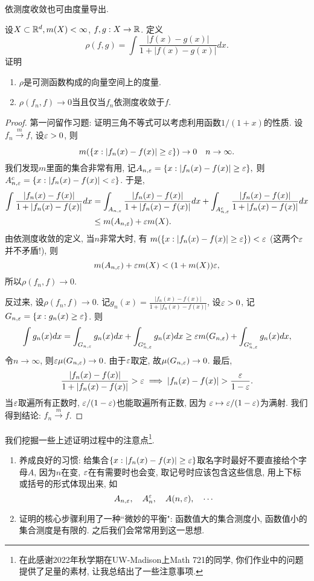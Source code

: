 依测度收敛也可由度量导出.
\begin{example}
    设$X \subset \mathbb{R}^d, m(X)<\infty$, $f, g: X \to \mathbb{R}$. 定义
    $$\rho(f,g) = \int \frac{|f(x)-g(x)|}{1+|f(x)-g(x)|}dx.$$
    证明
    \begin{enumerate}
        \item $\rho$是可测函数构成的向量空间上的度量.
        \item $\rho(f_n, f) \to 0$当且仅当$f_n$依测度收敛于$f$. 
    \end{enumerate}
\end{example}
\begin{proof}
    第一问留作习题: 证明三角不等式可以考虑利用函数$1/(1+x)$的性质.
    设$f_n \xrightarrow[]{m} f$, 设$\varepsilon > 0$, 则
    $$m(\{x:|f_n(x)-f(x)| \geq \varepsilon\}) \to 0 \quad n \to \infty.$$
    我们发现$m$里面的集合非常有用, 记$A_{n, \varepsilon} = \{x:|f_n(x)-f(x)| \geq \varepsilon\},$ 则$A_{n, \varepsilon}^c = \{x:|f_n(x)-f(x)| < \varepsilon\}$. 于是,
    \begin{align*}
    \int \frac{|f_n(x)-f(x)|}{1+|f_n(x)-f(x)|}dx
    &= \int_{A_{n,\varepsilon}}\frac{|f_n(x)-f(x)|}{1+|f_n(x)-f(x)|}dx 
       + \int_{A_{n,\varepsilon}^c}\frac{|f_n(x)-f(x)|}{1+|f_n(x)-f(x)|}dx \\
    &\leq m(A_{n, \varepsilon}) + \varepsilon m(X).
    \end{align*}
    由依测度收敛的定义, 当$n$非常大时, 有
    $m(\{x:|f_n(x)-f(x)| \geq \varepsilon\}) < \varepsilon$ (这两个$\varepsilon$并不矛盾!), 则$$ m(A_{n,\varepsilon}) + \varepsilon m(X) < (1+m(X))\varepsilon, $$ 
    所以$\rho(f_n, f) \to 0$. 

    反过来, 设$\rho(f_n, f) \to 0$. 记$g_n(x) =  \frac{|f_n(x)-f(x)|}{1+|f_n(x)-f(x)|}$, 设$\varepsilon > 0$, 记
    $G_{n,\varepsilon} = \{x: g_n(x) \geq \varepsilon\}$. 则
    $$\int g_n(x)dx = \int_{G_{n,\varepsilon}}g_n(x)dx + 
      \int_{G_{n,\varepsilon}^c} g_n(x)dx \geq \varepsilon m(G_{n,\varepsilon})
      +  \int_{G_{n,\varepsilon}^c} g_n(x)dx, $$
    令$n \to \infty$, 则$\varepsilon \mu(G_{n,\varepsilon}) \to 0$. 由于$\varepsilon$取定, 故$ \mu(G_{n,\varepsilon}) \to 0 $.
    最后, 
    $$\frac{|f_n(x)-f(x)|}{1+|f_n(x)-f(x)|}>\varepsilon \implies 
    |f_n(x)-f(x)| > \frac{\varepsilon}{1-\varepsilon}.$$
    当$\varepsilon$取遍所有正数时, $\varepsilon/(1-\varepsilon)$也能取遍所有正数, 因为
    $\varepsilon \mapsto \varepsilon/(1-\varepsilon)$为满射. 我们得到结论: $f_n \xrightarrow[]{m} f$.
\end{proof}
\begin{remark}
    我们挖掘一些上述证明过程中的注意点\footnote{在此感谢2022年秋学期在UW-Madison上Math 721的同学, 你们作业中的问题提供了足量的素材, 让我总结出了一些注意事项. }. 
    \begin{enumerate}
    \item 养成良好的习惯: 给集合$\{x:|f_n(x)-f(x)| \geq \varepsilon\}$取名字时最好不要直接给个字母$A$, 因为$n$在变, $\varepsilon$在有需要时也会变, 取记号时应该包含这些信息, 用上下标或括号的形式体现出来, 如
    $$A_{n,\varepsilon},\quad A_n^\varepsilon,\quad A(n,\varepsilon), \quad \cdots$$
    \item 证明的核心步骤利用了一种``微妙的平衡": 函数值大的集合测度小, 函数值小的集合测度是有限的. 之后我们会常常用到这一思想.
    \end{enumerate}
\end{remark}
